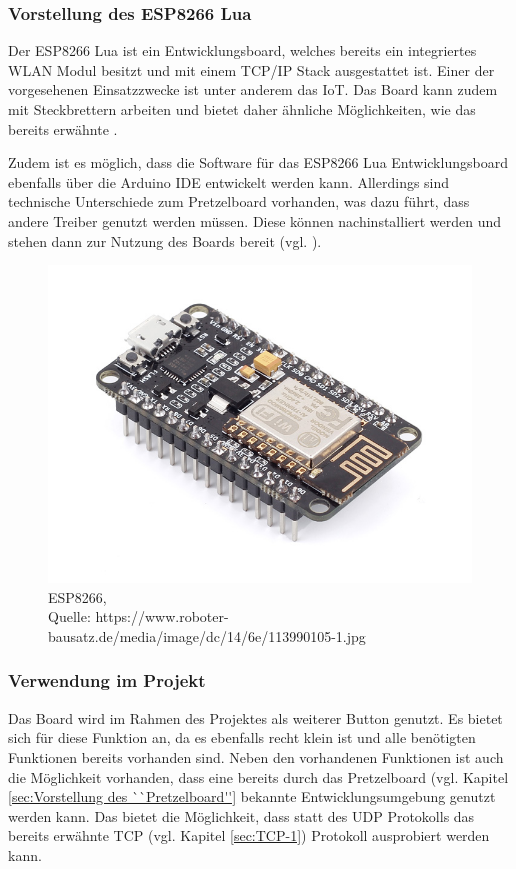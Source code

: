 \subsubsection{Vorstellung des ESP8266 Lua}        
\label{sec:Vorstellung des ESP8266} 

Der ESP8266 Lua ist ein Entwicklungsboard, welches bereits ein integriertes \ac{WLAN} Modul besitzt und mit einem \ac{TCP}/\ac{IP} Stack ausgestattet ist. Einer der vorgesehenen Einsatzzwecke ist unter anderem das \ac{IoT}. Das Board kann zudem mit Steckbrettern arbeiten und bietet daher ähnliche Möglichkeiten, wie das bereits erwähnte . 

Zudem ist es möglich, dass die Software für das ESP8266 Lua Entwicklungsboard ebenfalls über die Arduino \ac{IDE} entwickelt werden kann. Allerdings sind technische Unterschiede zum Pretzelboard vorhanden, was dazu führt, dass andere Treiber genutzt werden müssen. 
Diese können nachinstalliert werden und stehen dann zur Nutzung des Boards bereit (vgl. \cite{Carius.15.01.2017}\cite{.d}).

\begin{figure}[!htb]
	\centering
	\includegraphics[scale=0.4]{ESP.jpg}
	\caption[ESP8266]{ESP8266,\\ Quelle: https://www.roboter-bausatz.de/media/image/dc/14/6e/113990105-1.jpg}
\end{figure}

\subsubsection{Verwendung im Projekt}        
\label{sec:Verwendung des ESP8266} 
Das Board wird im Rahmen des Projektes als weiterer Button genutzt. Es bietet sich für diese Funktion an, da es ebenfalls recht klein ist und alle benötigten Funktionen bereits vorhanden sind. Neben den vorhandenen Funktionen ist auch die Möglichkeit vorhanden, dass eine bereits durch das Pretzelboard (vgl. Kapitel \ref{sec:Vorstellung des ``Pretzelboard''} bekannte Entwicklungsumgebung genutzt werden kann. Das bietet die Möglichkeit, dass statt des \ac{UDP} Protokolls das bereits erwähnte \ac{TCP} (vgl. Kapitel \ref{sec:TCP-1}) Protokoll ausprobiert werden kann. 

